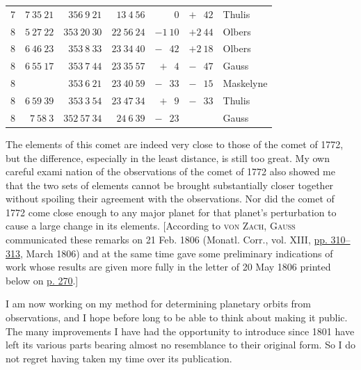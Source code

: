 \begin{center}
\begin{tabular}{r|r|r|r|r|r|l}
7 & $7\ 35\ 21$ & $356\ 9\ 21$ & $13\ 4\ 56$ & $\phantom{+1}\ 0$ & $+\phantom{1}\ 42$ & Thulis\\
8 & $5\ 27\ 22$ & $353\ 20\ 30$ & $22\ 56\ 24$ & $-1\ 10$ & $+2\ 44$ & Olbers\\
8 & $6\ 46\ 23$ & $353\ 8\ 33$ & $23\ 34\ 40$ & $-\phantom{1}\ 42$ & $+2\ 18$ & Olbers\\
8 & $6\ 55\ 17$ & $353\ 7\ 44$ & $23\ 35\ 57$ & $+\phantom{1}\ 4$ & $-\phantom{1}\ 47$ & Gauss\\
8 & & $353\ 6\ 21$ & $23\ 40\ 59$ & $-\phantom{1}\ 33$ & $-\phantom{1}\ 15$ & Maskelyne\\
8 & $6\ 59\ 39$ & $353\ 3\ 54$ & $23\ 47\ 34$ & $+\phantom{1}\ 9$ & $-\phantom{1}\ 33$ & Thulis\\
8 & $7\ 58\ 3$ & $352\ 57\ 34$ & $24\ 6\ 39$ & $-\phantom{1}\ 23$ & & Gauss\\
\end{tabular}\endgroup
\end{center}

\par\indent The elements of this comet are indeed very close to those of the comet of 1772, but the difference, especially in the least distance, is still too great. My own careful exami%
%
nation of the observations of the comet of 1772 also showed me that the two sets of elements cannot be brought substantially closer together without spoiling their agreement with the observations. Nor did the comet of 1772 come close enough to any major planet for that planet’s perturbation to cause a large change in its elements. [According to \textsc{von Zach}, \textsc{Gauss} communicated these remarks on 21 Feb. 1806 (Monatl. Corr., vol. XIII, \href{https://www.digitale-sammlungen.de/en/view/bsb10538605?page=320}{pp. 310–313}, March 1806) and at the same time gave some preliminary indications of work whose results are given more fully in the letter of 20 May 1806 printed below on \hyperlink{native-275-lower}{p. 270}.]

\par\indent I am now working on my method for determining planetary orbits from observations, and I hope before long to be able to think about making it public. The many improvements I have had the opportunity to introduce since 1801 have left its various parts bearing almost no resemblance to their original form. So I do not regret having taken my time over its publication.

